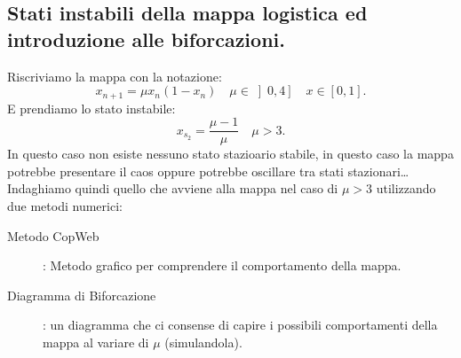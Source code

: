 \subsection{Stati instabili della mappa logistica ed introduzione alle biforcazioni.}%
Riscriviamo la mappa con la notazione:
\[
    x_{n+1} = \mu x_n(1-x_n) \quad  \mu  \in \left]0, 4\right] \quad  x \in \left[0, 1\right]
.\] 
E prendiamo lo stato instabile:
\[
    x_{s_2} = \frac{\mu-1}{\mu} \quad  \mu  > 3
.\] 
In questo caso non esiste nessuno stato stazioario stabile, in questo caso la mappa potrebbe presentare il caos oppure potrebbe oscillare tra stati stazionari\ldots\\
Indaghiamo quindi quello che avviene alla mappa nel caso di $\mu >3$ utilizzando due metodi numerici:
\begin{description}
    \item [Metodo CopWeb]: Metodo grafico per comprendere il comportamento della mappa.	
    \item [Diagramma di Biforcazione]: un diagramma che ci consense di capire i possibili comportamenti della mappa al variare di $\mu$ (simulandola).
\end{description}
